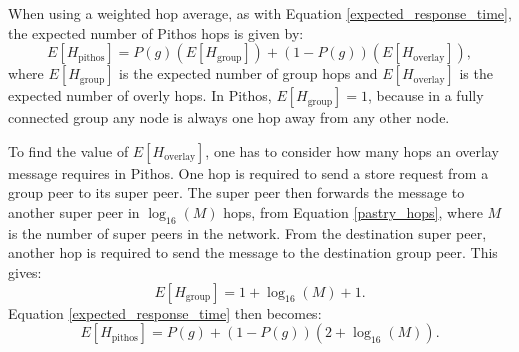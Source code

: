 \documentclass[10pt,a4paper,conference]{IEEEtran}
\begin{document}
When using a weighted hop average, as with Equation \eqref{expected_response_time}, the expected number of Pithos hops is given by:
%
\begin{equation}\label{expected_response_time}
    E[H_{\textrm{pithos}}] = P(g)\left(E\left[H_{\textrm{group}}\right]\right) + \left(1 - P(g)\right)\left(E\left[H_{\textrm{overlay}}\right]\right),
\end{equation}
%
where $E\left[H_{\textrm{group}}\right]$ is the expected number of group hops and $E\left[H_{\textrm{overlay}}\right]$ is the expected number of
overly hops. In Pithos, $E\left[H_{\textrm{group}}\right] = 1$, because in a fully connected group any node is always one hop away from any other
node.

To find the value of $E\left[H_{\textrm{overlay}}\right]$, one has to consider how many hops an overlay message requires in Pithos. One hop is
required to send a store request from a group peer to its super peer. The super peer then forwards the message to another super peer in
$\log_{16}(M)$ hops, from Equation \eqref{pastry_hops}, where $M$ is the number of super peers in the network. From the destination super peer,
another hop is required to send the message to the destination group peer. This gives:
%
\begin{equation}\label{group_hops}
    E\left[H_{\textrm{group}}\right] = 1 + \log_{16}(M) + 1.
\end{equation}
%
Equation \eqref{expected_response_time} then becomes:
%
\begin{equation}\label{expected_response_time_exp}
    E[H_{\textrm{pithos}}] = P(g) + \left(1 - P(g)\right)\left(2 + \log_{16}\left(M\right)\right).
\end{equation}
\end{document}
